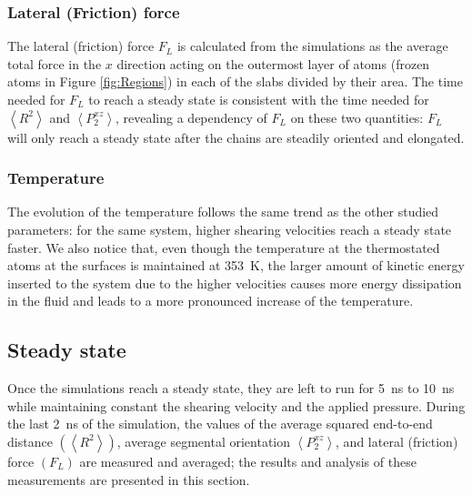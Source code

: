 \documentclass[aps,prb,reprint,superscriptaddress, a4paper]{revtex4-1}
\begin{document}

\subsubsection{Lateral (Friction) force}

The lateral (friction) force $F_L$ is calculated from the simulations as the average total force in the $x$ direction acting on the outermost layer of atoms (frozen atoms in Figure \ref{fig:Regions}) in each of the slabs divided by their area. The time needed for $F_L$  to reach a steady state is consistent with the time  needed for $\left< R^2 \right> $ and $\left<P_{2}^{xz} \right> $, revealing a dependency of $F_L$ on these two quantities: $F_L$ will only reach a steady state after the chains are steadily oriented and elongated.



\subsubsection{Temperature}

The evolution of the temperature follows the same trend as the other studied parameters: for the same system,  higher shearing velocities reach a steady state faster. We also notice that, even though the temperature at the thermostated atoms at the surfaces is maintained at  \SI{353}{\kelvin}, the larger amount of kinetic energy inserted to the system due to the higher velocities causes more energy dissipation in the fluid and leads to a more pronounced increase of the  temperature.




\subsection{Steady state}

Once the simulations reach a steady state, they are left to run for  \SI{5}{\nano\second} to  \SI{10}{\nano\second}  while maintaining constant the shearing velocity and the applied pressure. During the last  \SI{2}{\nano\second} of the simulation, the values of the average squared end-to-end distance $\left(\left< R^2 \right> \right)$,   average segmental orientation $\left<P_{2}^{xz} \right> $, and lateral (friction) force $\left(F_L\right)$ are measured and averaged; the results and analysis of these measurements are presented in this section.   
\end{document}
